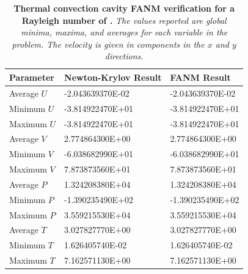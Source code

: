 \begin{table}[h!]
  \begin{center}
    \begin{tabular}{lll}\hline\hline
      \multicolumn{1}{l}{Parameter}& 
      \multicolumn{1}{l}{Newton-Krylov Result}&
      \multicolumn{1}{l}{FANM Result}\\
      \hline
      Average $U$ & -2.043639370E-02 & -2.043639370E-02 \\
      Minimum $U$ & -3.814922470E+01 & -3.814922470E+01 \\
      Maximum $U$ & -3.814922470E+01 & -3.814922470E+01 \\
      \hline
      Average $V$ & 2.774864300E+00 & 2.774864300E+00 \\
      Minimum $V$ & -6.038682990E+01 & -6.038682990E+01 \\
      Maximum $V$ & 7.873873560E+01 & 7.873873560E+01 \\
      \hline
      Average $P$ & 1.324208380E+04 & 1.324208380E+04 \\
      Minimum $P$ & -1.390235490E+02 & -1.390235490E+02 \\
      Maximum $P$ & 3.559215530E+04 & 3.559215530E+04 \\
      \hline
      Average $T$ & 3.027827770E+00 & 3.027827770E+00 \\
      Minimum $T$ & 1.626405740E-02 & 1.626405740E-02 \\
      Maximum $T$ & 7.162571130E+00 & 7.162571130E+00 \\
      \hline\hline
    \end{tabular}
  \end{center}
  \caption{\textbf{Thermal convection cavity FANM verification for a
      Rayleigh number of .} \textit{The values reported are
      global minima, maxima, and averages for each variable in the
      problem. The velocity is given in components in the $x$ and $y$
      directions.}}
  \label{tab:convection_ra1e5_results}
\end{table}

